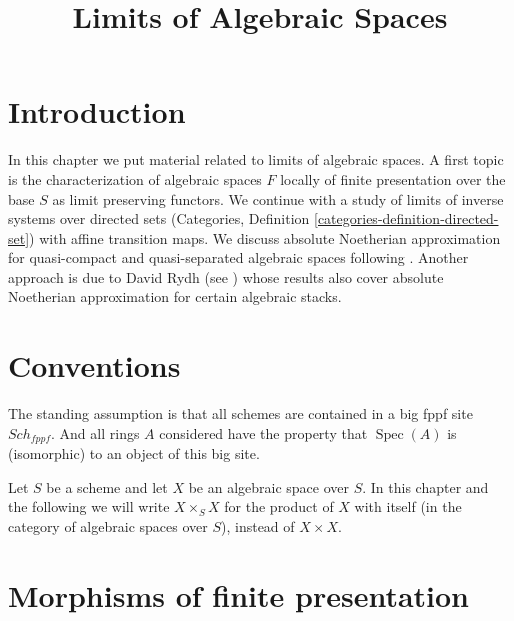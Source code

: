 \documentclass{stacks-project}
\theoremstyle{plain}
\theoremstyle{definition}
\theoremstyle{remark}
\numberwithin{equation}{subsection}
\def\Spec{\mathop{\mathrm{Spec}}}
\def\Sch{\mathit{Sch}}
\begin{document}
\title{Limits of Algebraic Spaces}


\maketitle

\label{section-phantom}

\tableofcontents

\section{Introduction}
\label{section-introduction}

\noindent
In this chapter we put material related to limits of algebraic spaces.
A first topic is the characterization of algebraic spaces $F$ locally
of finite presentation over the base $S$ as limit preserving functors.
We continue with a study of limits of inverse systems over
directed sets (Categories, Definition \ref{categories-definition-directed-set})
with affine transition maps. We discuss absolute
Noetherian approximation for quasi-compact and quasi-separated algebraic
spaces following \cite{CLO}. Another approach is due to David Rydh (see
\cite{rydh_approx}) whose results also cover absolute Noetherian
approximation for certain algebraic stacks.


\section{Conventions}
\label{section-conventions}

\noindent
The standing assumption is that all schemes are contained in
a big fppf site $\Sch_{fppf}$. And all rings $A$ considered
have the property that $\Spec(A)$ is (isomorphic) to an
object of this big site.

\medskip\noindent
Let $S$ be a scheme and let $X$ be an algebraic space over $S$.
In this chapter and the following we will write $X \times_S X$
for the product of $X$ with itself (in the category of algebraic
spaces over $S$), instead of $X \times X$.











\section{Morphisms of finite presentation}
\label{section-finite-presentation}
\end{document}
